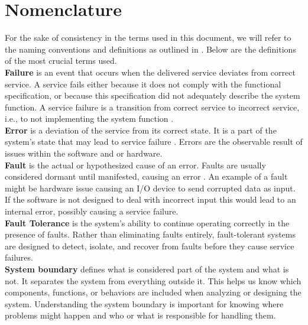 \section{Nomenclature}

For the sake of consistency in the terms used in this document, we will refer to the naming conventions and definitions as outlined in \cite{1335465}. Below are the definitions of the most crucial terms used. \\

\textbf{Failure} is an event that occurs when the delivered service deviates from correct service. A service fails either because it does not comply with the functional specification, or because this specification did not adequately describe the system function. A service failure is a transition from correct service to incorrect service, i.e., to not implementing the system function \cite{1335465}. \\

\textbf{Error} is a deviation of the service from its correct state. It is a part of the system's state that may lead to service failure \cite{1335465}. Errors are the observable result of issues within the software and or hardware. \\

\textbf{Fault} is the actual or hypothesized cause of an error. Faults are usually considered dormant until manifested, causing an error \cite{1335465}. An example of a fault might be hardware issue causing an I/O device to send corrupted data as input. If the software is not designed to deal with incorrect input this would lead to an internal error, possibly causing a service failure. \\

\textbf{Fault Tolerance} is the system's ability to continue operating correctly in the presence of faults. Rather than eliminating faults entirely, fault-tolerant systems are designed to detect, isolate, and recover from faults before they cause service failures. \\

\textbf{System boundary} defines what is considered part of the system and what is not. It separates the system from everything outside it. This helps us know which components, functions, or behaviors are included when analyzing or designing the system. Understanding the system boundary is important for knowing where problems might happen and who or what is responsible for handling them.
